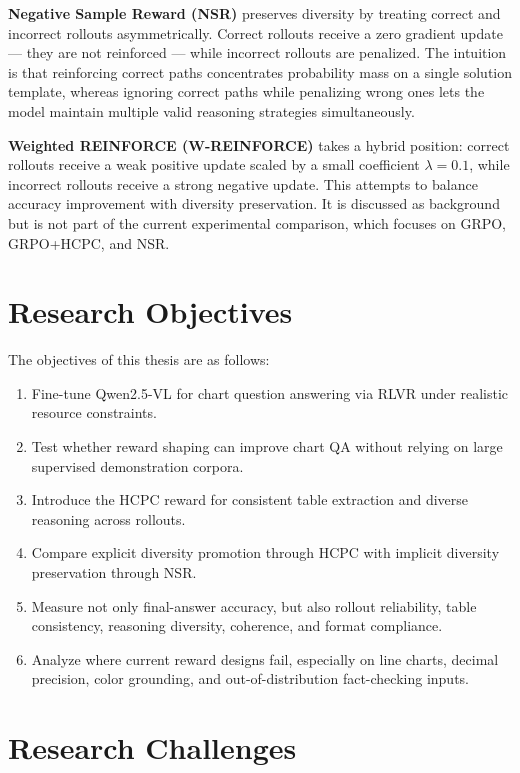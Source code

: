 \documentclass{iutbscthesis}
\begin{document}
\textbf{Negative Sample Reward (NSR)} \cite{zhu2025rlvrdecomposed} preserves diversity by treating correct and incorrect rollouts asymmetrically. Correct rollouts receive a zero gradient update --- they are not reinforced --- while incorrect rollouts are penalized. The intuition is that reinforcing correct paths concentrates probability mass on a single solution template, whereas ignoring correct paths while penalizing wrong ones lets the model maintain multiple valid reasoning strategies simultaneously.

\textbf{Weighted REINFORCE (W-REINFORCE)} \cite{zhu2025rlvrdecomposed} takes a hybrid position: correct rollouts receive a weak positive update scaled by a small coefficient $\lambda = 0.1$, while incorrect rollouts receive a strong negative update. This attempts to balance accuracy improvement with diversity preservation. It is discussed as background but is not part of the current experimental comparison, which focuses on GRPO, GRPO+HCPC, and NSR.

\section{Research Objectives}

The objectives of this thesis are as follows:

\begin{enumerate}
    \item Fine-tune Qwen2.5-VL for chart question answering via RLVR under realistic resource constraints.
    \item Test whether reward shaping can improve chart QA without relying on large supervised demonstration corpora.
    \item Introduce the HCPC reward for consistent table extraction and diverse reasoning across rollouts.
    \item Compare explicit diversity promotion through HCPC with implicit diversity preservation through NSR.
    \item Measure not only final-answer accuracy, but also rollout reliability, table consistency, reasoning diversity, coherence, and format compliance.
    \item Analyze where current reward designs fail, especially on line charts, decimal precision, color grounding, and out-of-distribution fact-checking inputs.
\end{enumerate}

\section{Research Challenges}
\end{document}
